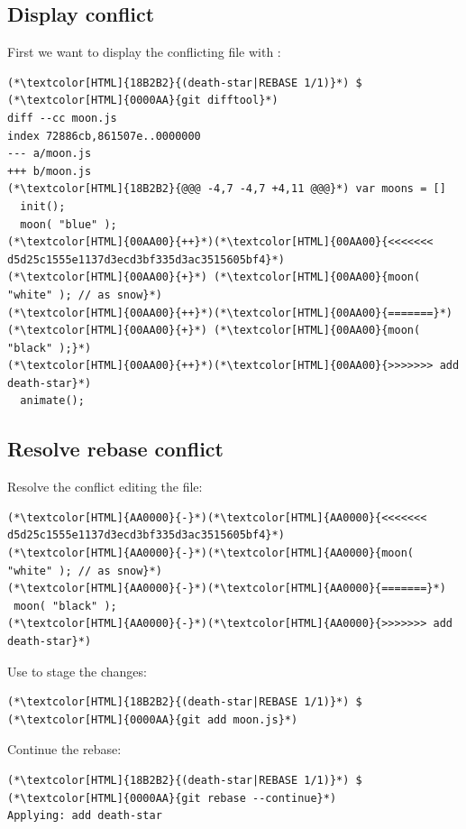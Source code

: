 \subsection{Display conflict}
\begin{frame}[fragile]
  \subslidetitle
  First we want to display the conflicting file with :
  \begin{lstlisting}
(*\textcolor[HTML]{18B2B2}{(death-star|REBASE 1/1)}*) $ (*\textcolor[HTML]{0000AA}{git difftool}*)
diff --cc moon.js
index 72886cb,861507e..0000000
--- a/moon.js
+++ b/moon.js
(*\textcolor[HTML]{18B2B2}{@@@ -4,7 -4,7 +4,11 @@@}*) var moons = []
  init();
  moon( "blue" );
(*\textcolor[HTML]{00AA00}{++}*)(*\textcolor[HTML]{00AA00}{<<<<<<< d5d25c1555e1137d3ecd3bf335d3ac3515605bf4}*)
(*\textcolor[HTML]{00AA00}{+}*) (*\textcolor[HTML]{00AA00}{moon( "white" ); // as snow}*)
(*\textcolor[HTML]{00AA00}{++}*)(*\textcolor[HTML]{00AA00}{=======}*)
(*\textcolor[HTML]{00AA00}{+}*) (*\textcolor[HTML]{00AA00}{moon( "black" );}*)
(*\textcolor[HTML]{00AA00}{++}*)(*\textcolor[HTML]{00AA00}{>>>>>>> add death-star}*)
  animate();
\end{lstlisting}
\end{frame}

\subsection{Resolve rebase conflict}
\begin{frame}[fragile]
  \subslidetitle
  Resolve the conflict editing the  file:

  \begin{lstlisting}
(*\textcolor[HTML]{AA0000}{-}*)(*\textcolor[HTML]{AA0000}{<<<<<<< d5d25c1555e1137d3ecd3bf335d3ac3515605bf4}*)
(*\textcolor[HTML]{AA0000}{-}*)(*\textcolor[HTML]{AA0000}{moon( "white" ); // as snow}*)
(*\textcolor[HTML]{AA0000}{-}*)(*\textcolor[HTML]{AA0000}{=======}*)
 moon( "black" );
(*\textcolor[HTML]{AA0000}{-}*)(*\textcolor[HTML]{AA0000}{>>>>>>> add death-star}*)
\end{lstlisting}

  \vspace{1em}
  Use  to stage the changes:
  \begin{lstlisting}
(*\textcolor[HTML]{18B2B2}{(death-star|REBASE 1/1)}*) $ (*\textcolor[HTML]{0000AA}{git add moon.js}*)
\end{lstlisting}

  Continue the rebase:
  \begin{lstlisting}
(*\textcolor[HTML]{18B2B2}{(death-star|REBASE 1/1)}*) $ (*\textcolor[HTML]{0000AA}{git rebase --continue}*)
Applying: add death-star
\end{lstlisting}
\end{frame}

